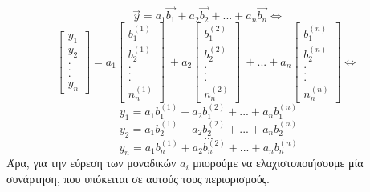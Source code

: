 \documentclass[12pt]{article}
\begin{document}
$$\vec{y} = a_1\vec{b_1} + a_2\vec{b_2} + ... + a_n\vec{b_n} \Leftrightarrow $$
$$ \begin{bmatrix}
	y_{1}\\
	y_{2}\\
	.\\
	.\\
	.\\
	y_{n}
\end{bmatrix} = a_1
\begin{bmatrix}
b_{1}^{(1)}\\
b_{2}^{(1)}\\
.\\
.\\
.\\
n_{n}^{(1)}
\end{bmatrix} \ + a_2
\begin{bmatrix}
b_{1}^{(2)}\\
b_{2}^{(2)}\\
.\\
.\\
.\\
n_{n}^{(2)}
\end{bmatrix} \ +...+a_n
\begin{bmatrix}
b_{1}^{(n)}\\
b_{2}^{(n)}\\
.\\
.\\
.\\
n_{n}^{(n)}
\end{bmatrix} \Leftrightarrow \ $$
$$ y_1 = a_1b_{1}^{(1)} + a_2b_{1}^{(2)} +...+ a_nb_{1}^{(n)} $$
$$ y_2 = a_1b_{2}^{(1)} + a_2b_{2}^{(2)} +...+ a_nb_{2}^{(n)} $$
$$ ... $$
$$ y_n = a_1b_{n}^{(1)} + a_2b_{n}^{(2)} +...+ a_nb_{n}^{(n)} $$
Άρα, για την εύρεση των μοναδικών $a_i$ μπορούμε να ελαχιστοποιήσουμε μία συνάρτηση, που υπόκειται σε αυτούς τους περιορισμούς. \\
\vspace{2in}
\end{document}
